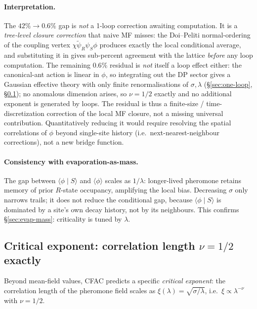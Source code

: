 \documentclass[10pt,a4paper,twocolumn]{article}
\newcommand{\psit}{\tilde\psi}
\newcommand{\avg}[1]{\langle #1 \rangle}
\theoremstyle{definition}
\begin{document}
\paragraph{Interpretation.}
The $42\%\!\to\!0.6\%$ gap is \emph{not} a 1-loop correction
awaiting computation.  It is a \emph{tree-level closure correction}
that naive MF misses: the Doi--Peliti normal-ordering of the
coupling vertex $\chi\psit_R\psi_S\phi$ produces exactly the
local conditional average, and substituting it in gives
sub-percent agreement with the lattice \emph{before} any loop
computation.  The remaining $0.6\%$ residual is \emph{not}
itself a loop effect either: the canonical-ant action is linear
in $\phi$, so integrating out the DP sector gives a Gaussian
effective theory with only finite renormalisations of
$\sigma,\lambda$ (\S\ref{sec:one-loop}, \S\ref{sec:ant-nu}); no
anomalous dimension arises, so $\nu = 1/2$ exactly and no
additional exponent is generated by loops.  The residual is
thus a finite-size / time-discretization correction of the
local MF closure, not a missing universal contribution.
Quantitatively reducing it would require resolving the
spatial correlations of $\phi$ beyond single-site history
(i.e.\ next-nearest-neighbour corrections), not a new bridge
function.

\paragraph{Consistency with evaporation-as-mass.}
The gap between $\avg{\phi\mid S}$ and $\avg\phi$ scales as
$1/\lambda$: longer-lived pheromone retains memory of prior
$R$-state occupancy, amplifying the local bias.  Decreasing
$\sigma$ only narrows trails; it does not reduce the
conditional gap, because $\avg{\phi\mid S}$ is dominated by a
site's own decay history, not by its neighbours.  This confirms
\S\ref{sec:evap-mass}: criticality is tuned by $\lambda$.

\subsection{Critical exponent: correlation length $\nu = 1/2$ exactly}
\label{sec:ant-nu}

Beyond mean-field values, CFAC predicts a specific
\emph{critical exponent}: the correlation length of the
pheromone field scales as $\xi(\lambda) = \sqrt{\sigma/\lambda}$,
i.e.\ $\xi \propto \lambda^{-\nu}$ with $\nu = 1/2$.
\end{document}
